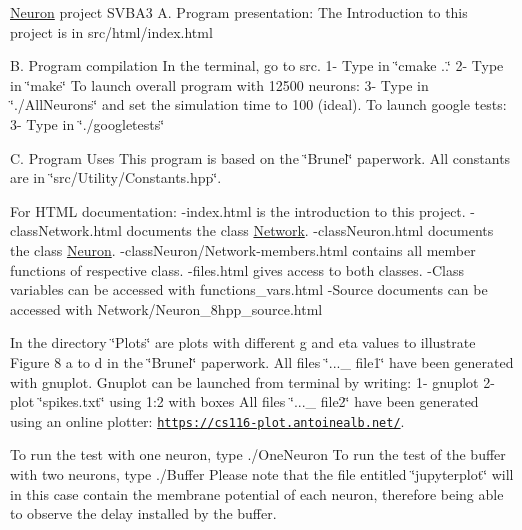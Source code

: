 \hyperlink{classNeuron}{Neuron} project S\-V\-B\-A3 A. Program presentation\-: The Introduction to this project is in src/html/index.\-html

B. Program compilation In the terminal, go to src. 1-\/ Type in \char`\"{}cmake ..\char`\"{} 2-\/ Type in \char`\"{}make\char`\"{} To launch overall program with 12500 neurons\-: 3-\/ Type in \char`\"{}./\-All\-Neurons\char`\"{} and set the simulation time to 100 (ideal). To launch google tests\-: 3-\/ Type in \char`\"{}./googletests\char`\"{}

C. Program Uses This program is based on the \char`\"{}\-Brunel\char`\"{} paperwork. All constants are in \char`\"{}src/\-Utility/\-Constants.\-hpp\char`\"{}.

For H\-T\-M\-L documentation\-: -\/index.\-html is the introduction to this project. -\/class\-Network.\-html documents the class \hyperlink{classNetwork}{Network}. -\/class\-Neuron.\-html documents the class \hyperlink{classNeuron}{Neuron}. -\/class\-Neuron/\-Network-\/members.\-html contains all member functions of respective class. -\/files.\-html gives access to both classes. -\/\-Class variables can be accessed with functions\-\_\-vars.\-html -\/\-Source documents can be accessed with Network/\-Neuron\-\_\-8hpp\-\_\-source.\-html

In the directory \char`\"{}\-Plots\char`\"{} are plots with different g and eta values to illustrate Figure 8 a to d in the \char`\"{}\-Brunel\char`\"{} paperwork. All files \char`\"{}...\-\_\- file1\char`\"{} have been generated with gnuplot. Gnuplot can be launched from terminal by writing\-: 1-\/ gnuplot 2-\/ plot \char`\"{}spikes.\-txt\char`\"{} using 1\-:2 with boxes All files \char`\"{}...\-\_\- file2\char`\"{} have been generated using an online plotter\-: \href{https://cs116-plot.antoinealb.net/}{\tt https\-://cs116-\/plot.\-antoinealb.\-net/}.

To run the test with one neuron, type ./\-One\-Neuron To run the test of the buffer with two neurons, type ./\-Buffer Please note that the file entitled \char`\"{}jupyterplot\char`\"{} will in this case contain the membrane potential of each neuron, therefore being able to observe the delay installed by the buffer. 